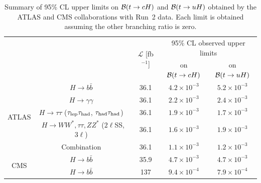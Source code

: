 \documentclass[PAPER, coverpage, atlasdraft=true, texlive=2016, UKenglish]{\ATLASLATEXPATH atlasdoc}
\providecommand{\DIFadd}[1]{{\protect\color{blue}\uwave{#1}}} %
\providecommand{\DIFaddFL}[1]{\DIFadd{#1}} %
\providecommand{\DIFaddbeginFL}{} %
\providecommand{\DIFaddendFL}{} %
\providecommand{\DIFdelbeginFL}{} %
\providecommand{\DIFdelendFL}{} %
\begin{document}
\begin{table}[t!]
\caption{\DIFdelbeginFL %
\DIFdelendFL \DIFaddbeginFL \small{Summary of 95\% CL upper limits on $\mathcal{B}(t \to cH)$ and $\mathcal{B}(t \to uH)$ obtained by the ATLAS and CMS collaborations with Run~2 data. Each limit is obtained assuming the other branching ratio is zero.}\DIFaddendFL }
\begin{center}
\small 
\begin{tabular}{ccccc}
\toprule\toprule
& &\multirow{2}{*}{$\mathcal{L}$ [fb$^{-1}$]} & \multicolumn{2}{c}{95\% CL observed upper limits}  \\
& & 										    & \multicolumn{1}{c}{on $\mathcal{B}(t \to cH)$}            & \multicolumn{1}{c}{on $\mathcal{B}(t \to uH)$} \\
\midrule
\multirow{5}{*}{ATLAS}
& $H \to b\bar{b}$~\cite{fcnc36}                                          & 36.1         & $4.2 \times 10^{-3}$ & $5.2 \times 10^{-3}$ \\
& $H \to \gamma\gamma$~\cite{Aaboud:2017mfd}                              & 36.1         & $2.2 \times 10^{-3}$  & $2.4 \times 10^{-3}$  \\
& $H \to \tau\tau$ ($\tau_{\mathrm{lep}} \tau_{\mathrm{had}}$, $\tau_{\mathrm{had}} \tau_{\mathrm{had}}$)~\cite{fcnc36}                   & 36.1         & $1.9 \times 10^{-3}$  & $1.7 \times 10^{-3}$  \\ 
& $H \to WW^*, \tau\tau, ZZ^*$ ($2\ell$SS, $3\ell$)~\cite{Aaboud:2018pob} & 36.1         & $1.6 \times 10^{-3}$  & $1.9 \times 10^{-3}$\\ 
& Combination~\cite{fcnc36}                                               & 36.1         & $1.1 \times 10^{-3}$  & $1.2 \times 10^{-3}$  \\\midrule
\multirow{2}{*}{CMS} 
& $H \to b\bar{b}$~\cite{Sirunyan:2017uae}                                & 35.9         & $4.7 \times 10^{-3}$  & $4.7 \times 10^{-3}$  \\
& $H \to b\bar{b}$~\cite{CMS:2021gfa}                                     & 137\DIFaddbeginFL \DIFaddFL{~~~~~          }\DIFaddendFL & $9.4 \times 10^{-4}$  & $7.9 \times 10^{-4}$  \\
% 
\bottomrule\bottomrule
\end{tabular}
\label{tab:limits_summary_ref}
\end{center}
\end{table}
\end{document}
